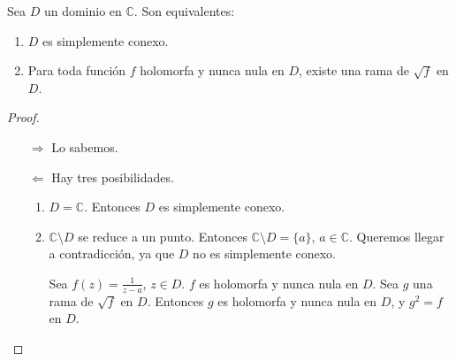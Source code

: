 \begin{theorem}
    Sea $D$ un dominio en $\mathbb{C}$.
    Son equivalentes:
    \begin{enumerate}
        \item $D$ es simplemente conexo.
        \item Para toda función $f$ holomorfa y nunca nula en $D$, existe una rama de $\sqrt{f}$ en $D$.
    \end{enumerate}
\end{theorem}

\begin{proof}
    \hfill
    \begin{itemize}
        \item[$\boxed{\Rightarrow}$] Lo sabemos.
        \item[$\boxed{\Leftarrow}$] Hay tres posibilidades.
            \begin{enumerate}
                \item $D = \mathbb{C}$.
                      Entonces $D$ es simplemente conexo.

                \item $\mathbb{C} \setminus D$ se reduce a un punto.
                      Entonces $\mathbb{C} \setminus D = \{a\}$, $a \in \mathbb{C}$.
                      Queremos llegar a contradicción, ya que $D$ no es simplemente conexo.

                      Sea $f(z) = \frac{1}{z-a}$, $z \in D$.
                      $f$ es holomorfa y nunca nula en $D$.
                      Sea $g$ una rama de $\sqrt{f}$ en $D$.
                      Entonces $g$ es holomorfa y nunca nula en $D$, y $g^2 = f$ en $D$.


\end{enumerate}
\end{itemize}
\end{proof}
